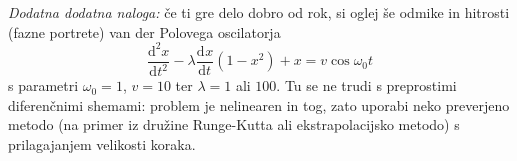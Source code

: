\documentclass[slovene,11pt,a4paper]{article}
\newcommand{\ddd}{\mathrm{d}}
\newcommand{\Dd}[3][{}]{\frac{\ddd^{#1} #2}{\ddd #3^{#1}}}
\begin{document}
\bigskip

{\it Dodatna dodatna naloga\/:} če ti gre delo dobro od rok,
si oglej še odmike in hitrosti (fazne portrete) van der Polovega oscilatorja
\begin{equation*}
\Dd[2]{x}{t} - \lambda\Dd{x}{t}
\left( 1 - x^2 \right) + x = v\cos\omega_0t
\end{equation*}
s parametri $\omega_0=1$, $v=10$ ter $\lambda=1$ ali $100$.
Tu se ne trudi s preprostimi diferenčnimi shemami: problem
je nelinearen in tog, zato uporabi neko preverjeno metodo
(na primer iz družine Runge-Kutta ali ekstrapolacijsko
metodo) s prilagajanjem velikosti koraka.
\end{document}
